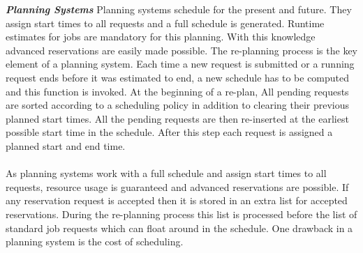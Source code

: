 \textbf{\textit{Planning Systems }}Planning systems schedule for the present and future. They assign start times to all requests and a full schedule is generated. Runtime estimates for jobs are mandatory for this planning. With this knowledge advanced reservations are easily made possible. The re-planning process is the key element of a planning system. Each time a new request is submitted or a running request ends before it was estimated to end, a new schedule has to be computed and this function is invoked. At the beginning of a re-plan, All pending requests are sorted according to a scheduling policy in addition to clearing their previous planned start times. All the pending requests are then re-inserted at the earliest possible start time in the schedule. After this step each request is assigned a planned start and end time.\\ \\
As planning systems work with a full schedule and assign start times to all requests, resource usage is guaranteed and advanced reservations are possible. If any reservation request is accepted then it is stored in an extra list for accepted reservations. During the re-planning process this list is processed before the list of standard job requests which can float around in the schedule. One drawback in a planning system is the cost of scheduling.
